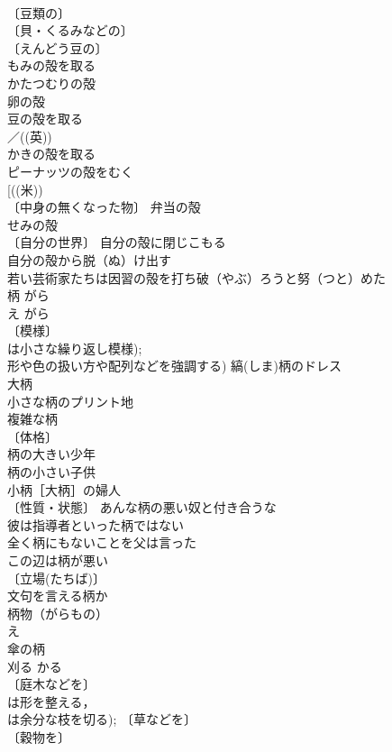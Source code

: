 \documentclass[8pt]{extreport}
\begin{document}
\begin{CJK}{UTF8}{min}
\\	〔豆類の〕
\\	〔貝・くるみなどの〕
\\	〔えんどう豆の〕
\\	もみの殻を取る 
\\	かたつむりの殻 
\\	卵の殻 
\\	豆の殻を取る 
\\	／((英)) 
\\	かきの殻を取る 
\\	ピーナッツの殻をむく 
\\	[((米)) 
\\	〔中身の無くなった物〕 弁当の殻 
\\	せみの殻 
\\	〔自分の世界〕 自分の殻に閉じこもる 
\\	自分の殻から脱（ぬ）け出す 
\\	若い芸術家たちは因習の殻を打ち破（やぶ）ろうと努（つと）めた 
\\	柄	がら 
\\	え	がら 
\\	〔模様〕
\\	は小さな繰り返し模様); 
\\	形や色の扱い方や配列などを強調する) 縞(しま)柄のドレス 
\\	大柄 
\\	小さな柄のプリント地 
\\	複雑な柄 
\\	〔体格〕
\\	柄の大きい少年 
\\	柄の小さい子供 
\\	小柄［大柄］の婦人 
\\	〔性質・状態〕 あんな柄の悪い奴と付き合うな 
\\	彼は指導者といった柄ではない 
\\	全く柄にもないことを父は言った 
\\	この辺は柄が悪い 
\\	〔立場(たちば)〕
\\	文句を言える柄か 
\\	柄物（がらもの） 
\\	え 
\\	傘の柄 
\\	刈る	かる	
\\	〔庭木などを〕
\\	は形を整える，
\\	は余分な枝を切る); 〔草などを〕
\\	〔穀物を〕

\end{CJK}
\end{document}
